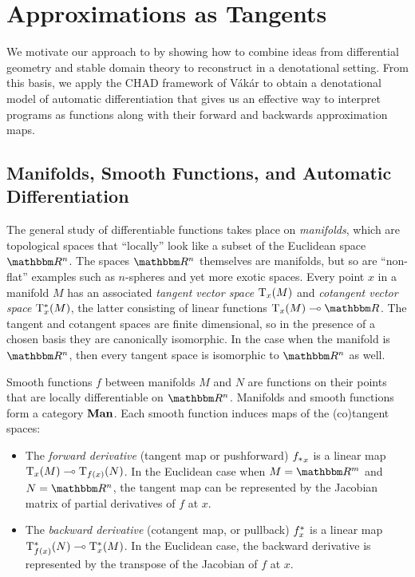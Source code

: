 \section{Approximations as Tangents}
\label{sec:approx-as-tangents}

We motivate our approach to \GPS by showing how to combine ideas from differential geometry and stable domain theory to reconstruct \GPS in a denotational setting. From this basis, we apply the CHAD framework of V{\'a}k{\'a}r \etal to obtain a denotational model of automatic differentiation that gives us an effective way to interpret programs as functions along with their forward and backwards approximation maps.

\subsection{Manifolds, Smooth Functions, and Automatic Differentiation}


The general study of differentiable functions takes place on \emph{manifolds}, which are topological spaces that ``locally'' look like a subset of the Euclidean space $\RR^n$. The spaces $\RR^n$ themselves are manifolds, but so are ``non-flat'' examples such as $n$-spheres and yet more exotic spaces. Every point $x$ in a manifold $M$ has an associated \emph{tangent vector space} $\mathrm{T}_x(M)$ and \emph{cotangent vector space} $\mathrm{T}^*_x(M)$, the latter consisting of linear functions $\tangents_x(M) \linearto \RR$. The tangent and cotangent spaces are finite dimensional, so in the presence of a chosen basis they are canonically isomorphic. In the case when the manifold is $\RR^n$, then every tangent space is isomorphic to $\RR^n$ as well.

Smooth functions $f$ between manifolds $M$ and $N$ are functions on their points that are locally differentiable on $\RR^n$. Manifolds and smooth functions form a category $\mathbf{Man}$. Each smooth function induces maps of the (co)tangent spaces:
\begin{itemize}
\item The \emph{forward derivative} (tangent map or pushforward) ${f_{*}}_x$ is a linear map $\mathrm{T}_x(M) \multimap \mathrm{T}_{f(x)}(N)$. In the Euclidean case when $M = \RR^m$ and $N = \RR^n$, the tangent map can be represented by the Jacobian matrix of partial derivatives of $f$ at $x$.
\item The \emph{backward derivative} (cotangent map, or pullback) $f^{*}_x$ is a linear map $\mathrm{T}^*_{f(x)}(N) \multimap \mathrm{T}^*_x(M)$. In the Euclidean case, the backward derivative is represented by the transpose of the Jacobian of $f$ at $x$.
\end{itemize}

